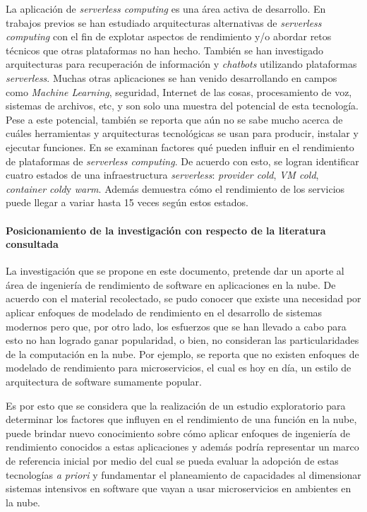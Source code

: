 La aplicación de \emph{serverless computing} es una área activa de desarrollo. En trabajos previos \cite{7979855,hendrickson2016serverless} se han estudiado arquitecturas alternativas de \emph{serverless computing} con el fin de explotar aspectos de rendimiento y/o abordar retos técnicos que otras plataformas no han hecho. También se han investigado arquitecturas para recuperación de información\cite{Crane:2017:ESA:3121050.3121086} y \emph{chatbots}\cite{Yan:2016:BCS:3007203.3007217} utilizando plataformas \emph{serverless}. Muchas otras aplicaciones se han venido desarrollando en campos como \emph{Machine Learning}, seguridad, Internet de las cosas, procesamiento de voz, sistemas de archivos, etc, y son solo una muestra del potencial de esta tecnología. Pese a este potencial, también se reporta que aún no se sabe mucho acerca de cuáles herramientas y arquitecturas tecnológicas se usan para producir, instalar y ejecutar funciones\cite{Spillner:2017:PTS:3147213.3149452}. En \cite{8360324} se examinan factores qué pueden influir en el rendimiento de plataformas de \emph{serverless computing}. De acuerdo con esto, se logran identificar cuatro estados de una infraestructura \emph{serverless}: \emph{provider cold}, \emph{VM cold}, \emph{container cold}y \emph{warm}. Además demuestra cómo el rendimiento de los servicios puede llegar a variar hasta 15 veces según estos estados.

\paragraph{Posicionamiento de la investigación con respecto de la literatura consultada}
La investigación que se propone en este documento, pretende dar un aporte al área de ingeniería de rendimiento de software en aplicaciones en la nube. De acuerdo con el material recolectado, se pudo conocer que existe una necesidad por aplicar enfoques de modelado de rendimiento en el desarrollo de sistemas modernos pero que, por otro lado, los esfuerzos que se han llevado a cabo para esto no han logrado ganar popularidad, o bien, no consideran las particularidades de la computación en la nube. Por ejemplo, se reporta que no existen enfoques de modelado de rendimiento para microservicios, el cual es hoy en día, un estilo de arquitectura de software sumamente popular.

Es por esto que se considera que la realización de un estudio exploratorio para determinar los factores que influyen en el rendimiento de una función en la nube, puede brindar nuevo conocimiento sobre cómo aplicar enfoques de ingeniería de rendimiento conocidos a estas aplicaciones y además podría representar un marco de referencia inicial por medio del cual se pueda evaluar la adopción de estas tecnologías \emph{a priori} y fundamentar el planeamiento de capacidades al dimensionar sistemas intensivos en software que vayan a usar microservicios en ambientes en la nube.
